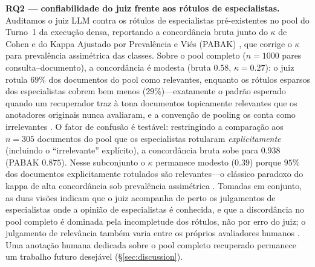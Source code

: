\documentclass[conference]{IEEEtran}
\begin{document}
\textbf{RQ2 --- confiabilidade do juiz frente aos rótulos de especialistas.}
Auditamos o juiz LLM contra os rótulos de especialistas pré-existentes no pool
do Turno~1 da execução densa, reportando a concordância bruta junto do
$\kappa$ de Cohen \cite{Cohen1960} e do Kappa Ajustado por Prevalência e Viés
(PABAK) \cite{Byrt1993PABAK}, que corrige o $\kappa$ para prevalência
assimétrica das classes. Sobre o pool completo ($n{=}1000$ pares
consulta--documento), a concordância é modesta (bruta $0.58$, $\kappa{=}0.27$):
o juiz rotula $69\%$ dos documentos do pool como relevantes, enquanto os
rótulos esparsos dos especialistas cobrem bem menos ($29\%$)---exatamente o
padrão esperado quando um recuperador traz à tona documentos topicamente
relevantes que os anotadores originais nunca avaliaram, e a convenção de
pooling os conta como irrelevantes \cite{Voorhees2000}. O fator de confusão é
testável: restringindo a comparação aos $n{=}305$ documentos do pool que os
especialistas rotularam \emph{explicitamente} (incluindo o ``irrelevante''
explícito), a concordância bruta sobe para $\mathbf{0.938}$ (PABAK $0.875$).
Nesse subconjunto o $\kappa$ permanece modesto ($0.39$) porque $95\%$ dos
documentos explicitamente rotulados são relevantes---o clássico paradoxo do
kappa de alta concordância sob prevalência assimétrica
\cite{Feinstein1990,Byrt1993PABAK}. Tomadas em conjunto, as duas visões indicam
que o juiz acompanha de perto os julgamentos de especialistas onde a opinião
de especialistas é conhecida, e que a discordância no pool completo é
dominada pela incompletude dos rótulos, não por erro do juiz; o julgamento de
relevância também varia entre os próprios avaliadores humanos
\cite{Voorhees2000}. Uma anotação humana dedicada sobre o pool completo
recuperado permanece um trabalho futuro desejável (\S\ref{sec:discussion}).
\end{document}
